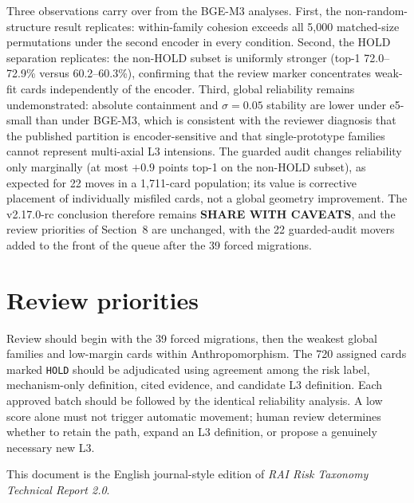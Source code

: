 \documentclass[11pt,a4paper]{article}
\newcommand{\code}[1]{\texttt{#1}}
\begin{document}
Three observations carry over from the BGE-M3 analyses. First, the
non-random-structure result replicates: within-family cohesion exceeds all
5,000 matched-size permutations under the second encoder in every condition.
Second, the HOLD separation replicates: the non-HOLD subset is uniformly
stronger (top-1 72.0--72.9\% versus 60.2--60.3\%), confirming that the review
marker concentrates weak-fit cards independently of the encoder. Third,
global reliability remains undemonstrated: absolute containment and
$\sigma=0.05$ stability are lower under e5-small than under BGE-M3, which is
consistent with the reviewer diagnosis that the published partition is
encoder-sensitive and that single-prototype families cannot represent
multi-axial L3 intensions. The guarded audit changes reliability only
marginally (at most $+0.9$ points top-1 on the non-HOLD subset), as expected
for 22 moves in a 1,711-card population; its value is corrective placement of
individually misfiled cards, not a global geometry improvement. The
v2.17.0-rc conclusion therefore remains \textbf{SHARE WITH CAVEATS}, and the
review priorities of Section~8 are unchanged, with the 22 guarded-audit
movers added to the front of the queue after the 39 forced migrations.

\section{Review priorities}

Review should begin with the 39 forced migrations, then the weakest global
families and low-margin cards within Anthropomorphism.
The 720 assigned cards marked \code{HOLD} should be adjudicated using agreement
among the risk label, mechanism-only definition, cited evidence, and candidate
L3 definition. Each approved batch should be followed by the identical
reliability analysis. A low score alone must not trigger automatic movement;
human review determines whether to retain the path, expand an L3 definition,
or propose a genuinely necessary new L3.

This document is the English journal-style edition of \textit{RAI Risk
Taxonomy Technical Report 2.0}.
\end{document}
